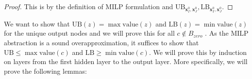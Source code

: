 \documentclass[]{article}
\newtheorem{lemma}{Lemma}
\theoremstyle{definition}
\newcommand{\ReLU}{\mathrm{ReLU}}
\newcommand{\Val}{\mathrm{value}}
\newcommand{\UB}{\mathrm{UB}}
\newcommand{\LB}{\mathrm{LB}}
\newcommand{\B}{\mathrm{B}}
\begin{document}
\begin{proof}
	This is by the definition of MILP formulation and $\UB_{\boldsymbol{x}^0_I,\boldsymbol{x}^0_J}, \LB_{\boldsymbol{x}^0_I,\boldsymbol{x}^0_J}$.
\end{proof}

%
%	
%	
%	
%	
%	


We want to show that $\mathrm{UB}(z) = \max \Val (z)$ and $\mathrm{LB}(z) = \min \Val(z)$ for the unique output nodes and we will prove this for all $c\notin B_{zero}$ . As the MILP abstraction is a sound overapproximation, 
it suffices to show that $\mathrm{UB}\leq \max \Val(c)$ and $\mathrm{LB} \geq \min \Val(c)$. We will prove this by induction on layers from the first hidden layer to the output layer. More specifically, we will prove the following lemmas:
\end{document}
